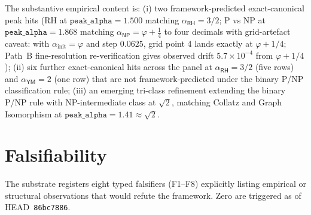 \documentclass[11pt,a4paper]{amsart}
\theoremstyle{plain}
\theoremstyle{definition}
\begin{document}
The substantive empirical content is: (i) two framework-predicted exact-canonical peak hits (RH at $\texttt{peak\_alpha} = 1.500$ matching $\alpha_{\textsf{RH}} = 3/2$; P vs NP at $\texttt{peak\_alpha} = 1.868$ matching $\alpha_{\textsf{NP}} = \varphi + \tfrac{1}{4}$ to four decimals with grid-artefact caveat: with $\alpha_{\mathrm{init}} = \varphi$ and step $0.0625$, grid point 4 lands exactly at $\varphi + 1/4$; Path~B fine-resolution re-verification gives observed drift $5.7 \times 10^{-4}$ from $\varphi + 1/4$); (ii) six further exact-canonical hits across the panel at $\alpha_{\textsf{RH}} = 3/2$ (five rows) and $\alpha_{\textsf{YM}} = 2$ (one row) that are not framework-predicted under the binary P/NP classification rule; (iii) an emerging tri-class refinement extending the binary P/NP rule with NP-intermediate class at $\sqrt{2}$, matching Collatz and Graph Isomorphism at $\texttt{peak\_alpha} = 1.41 \approx \sqrt{2}$.

\section{Falsifiability}\label{sec:falsifiers}

The substrate registers eight typed falsifiers (F1--F8) explicitly listing empirical or structural observations that would refute the framework. Zero are triggered as of HEAD~\texttt{86bc7886}.
\end{document}
